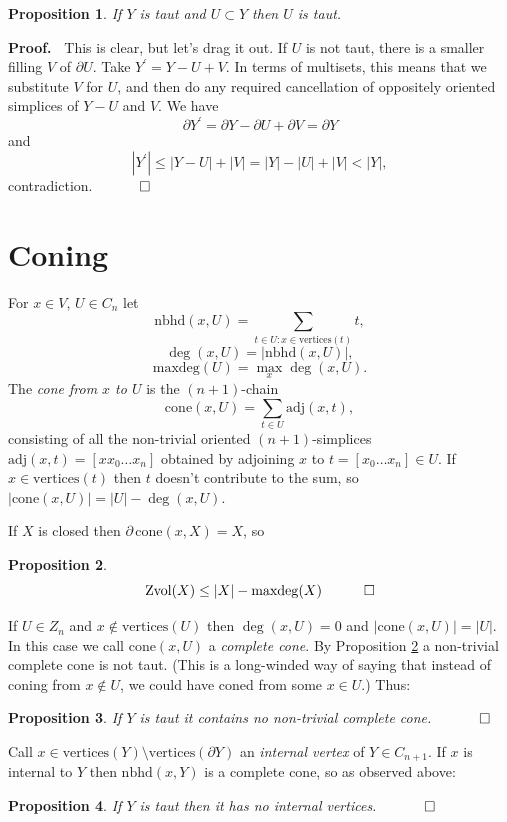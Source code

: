 \documentclass[12pt]{article}
\newtheorem{prop}{Proposition}
\newcommand{\proofstart}{{\noindent \bf Proof.\ }}
\newcommand{\mathproofend}{\quad \qed}
\newcommand{\proofend}{$\quad \qed$}
\def\del{\partial}
\newcommand{\kw}{\mathrm}
\newcommand{\cone}{\kw{cone}}
\newcommand{\maxdeg}{\kw{maxdeg}}
\newcommand{\vertices}{\kw{vertices}}
\newcommand{\nbhd}{\kw{nbhd}}
\newcommand{\adj}{\kw{adj}}
\newcommand{\Zvol}{\kw{Zvol}}
\begin{document}
\begin{prop} \label{subtaut}
If $Y$ is taut and $U \subset Y$ then $U$ is taut.
\end{prop}

\proofstart
This is clear, but let's drag it out.
If $U$ is not taut, there is a smaller filling $V$ of $\del U$.
Take $Y^\prime = Y-U+V$.
In terms of multisets, this means that we substitute $V$ for $U$,
and then do any required cancellation of oppositely oriented simplices
of $Y-U$ and $V$.
We have
\[
\del Y^\prime = \del Y - \del U + \del V = \del Y
\]
and
\[
|Y^\prime| \leq |Y-U| + |V| = |Y| - |U| + |V| < |Y|
,
\]
contradiction.
\proofend

\section{Coning}
For $x \in V$, $U \in C_n$ let
\[
\nbhd(x,U) = \sum_{ t \in U: x \in \vertices(t) } t
,
\]
\[
\deg(x,U) = |\nbhd(x,U)|
,
\]
\[
\maxdeg(U) = \max_x \deg(x,U)
.
\]
The \emph{cone from $x$ to $U$}
is the $(n+1)$-chain
\[
\cone(x,U) = 
\sum_{t \in U} \adj(x,t)
,
\]
consisting of all the non-trivial oriented
$(n+1)$-simplices $\adj(x,t)=[x x_0\ldots x_n]$ obtained
by adjoining $x$ to  $t = [x_0\ldots x_n] \in U$.
If $x \in \vertices(t)$ then $t$ doesn't contribute to the sum,
so $|\cone(x,U)| = |U| - \deg(x,U)$.

If $X$ is closed then
$\del\, \cone(x,X) = X$, so

\begin{prop} \label{maxdeg}
\[
\Zvol(X) \leq |X| - \maxdeg(X)
\mathproofend
\]
\end{prop}

If $U \in Z_n$ and $x \notin \vertices(U)$ then
$\deg(x,U)=0$ and
$|\cone(x,U)| = |U|$.
In this case we call $\cone(x,U)$ a \emph{complete cone}.
By Proposition \ref{maxdeg} a non-trivial complete cone is not taut.
(This is a long-winded way of saying that instead of coning from
$x \notin U$, we could have coned from some $x \in U$.)
Thus:
\begin{prop}
If $Y$ is taut it contains no non-trivial complete cone.
\proofend
\end{prop}

Call $x \in \vertices(Y) \setminus \vertices(\del Y)$ an
\emph{internal vertex} of $Y \in C_{n+1}$.
If $x$ is internal to $Y$ then $\nbhd(x,Y)$ is a complete cone, so
as observed above:
\begin{prop} \label{nointernal}
If $Y$ is taut then
it has no internal vertices.
\proofend
\end{prop}
\end{document}
